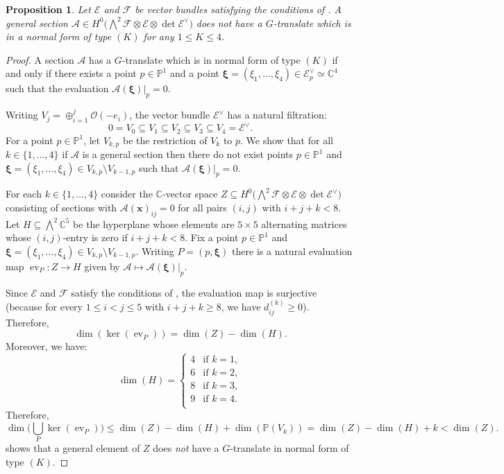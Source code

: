 \documentclass[11pt]{amsart}
\numberwithin{theorem}{section}
\numberwithin{equation}{section}
\newtheorem{proposition}[theorem]{Proposition}
\theoremstyle{definition}\newtheorem{defn}[theorem]{Definition}
\theoremstyle{definition}\newtheorem{remark}[theorem]{Remark}
\theoremstyle{definition}\newtheorem{question}[theorem]{Question}
\theoremstyle{definition}\newtheorem{problem}[theorem]{Problem}
\newcommand{\CC}{\mathbb{C}}
\newcommand{\PP}{\mathbb{P}}
\newcommand{\cE}{\mathcal{E}}
\newcommand{\cF}{\mathcal{F}}
\newcommand{\cA}{\mathcal{A}}
\newcommand{\cO}{\mathcal{O}}
\DeclareMathOperator{\ev}{ev}
\newcommand{\K}{K}
\begin{document}
\begin{proposition}
    \label{prop:case-K}
Let $\cE$ and $\cF$ be vector bundles satisfying the conditions of . A general section $\cA \in H^0 \Big(\bigwedge\nolimits^2 \cF \otimes \cE \otimes \det \cE^\vee \Big)$ does not have a $G$-translate which is in a normal form of type $(\K)$ for any $1 \leq \K \leq 4$.
\end{proposition}
\begin{proof}
A section $\cA$ has a $G$-translate which is in normal form of type $(\K)$ if and only if there exists a point $p \in \PP^1$ and a point $\boldsymbol{\xi} = (\xi_1, \dots ,\xi_4) \in \cE^{\vee}_p \simeq \CC^4$ such that the evaluation $\cA(\boldsymbol{\xi})\vert_p = 0$. 

Writing $V_j = \oplus_{i=1}^j \cO(-e_i)$, the vector bundle $\cE^{\vee}$ has a natural filtration:
\[
    0 = V_0 \subseteq V_1 \subseteq V_2 \subseteq V_3 \subseteq V_4 = \cE^{\vee}.
\]
For a point $p \in \PP^1$, let $V_{k,p}$ be the restriction of $V_k$ to $p$. We show that for all $k \in \{1,\dots, 4\}$ if $\cA$ is a general section then there do not exist points $p \in \PP^1$ and $\boldsymbol{\xi} = (\xi_1 , \dots ,\xi_4) \in V_{k,p} \setminus V_{k-1,p}$ such that $\cA(\boldsymbol{\xi})\vert_p = 0$.

For each $k \in \{1,\dots, 4\}$ consider the $\CC$-vector space $Z \subseteq H^0 \Big(\bigwedge\nolimits^2 \cF \otimes \cE \otimes \det \cE^\vee \Big)$ consisting of sections with $\cA(\mathbf{x})_{ij} = 0$ for all pairs $(i,j)$ with $i +j + k < 8$. Let $H \subseteq  \bigwedge^2 \CC^5$ be the hyperplane whose elements are $5 \times 5$ alternating matrices whose $(i,j)$-entry is zero if $i +j + k < 8$. Fix a point $p \in \PP^1$ and $\boldsymbol{\xi} = (\xi_1 , \dots, \xi_4) \in V_{k,p} \setminus V_{k-1,p}$. Writing $P = (p,\boldsymbol{\xi})$ there is a natural evaluation map $\ev_P : Z \to H$ given by $\cA \mapsto \cA(\boldsymbol{\xi})|_p $.

Since $\cE$ and $\cF$ satisfy the conditions of , the evaluation map is surjective (because for every $1 \leq i < j \leq 5$  with $i + j + k \geq 8$, we have $d_{ij}^{(k)} \geq 0$). Therefore, 
\[
    \dim(\ker (\ev_P)) = \dim(Z) - \dim(H).
\]
Moreover, we have:
\[
\dim(H) = 
\begin{cases}
  4 & \text{if } k = 1, \\
  6  & \text{if } k = 2, \\
  8  & \text{if } k = 3, \\
  9 & \text{if } k = 4. \\
\end{cases}
\]
Therefore, 
\begin{equation}
\label{eqn:dim-bound-K}
 \dim\Big (\bigcup_P \ker(\ev_P)\Big) \leq  \dim(Z) - \dim(H) + \dim(\PP(V_k)) = \dim(Z) - \dim(H) + k < \dim (Z). 
\end{equation}
 shows that a general element of $Z$ does \emph{not} have a $G$-translate in normal form of type $(\K)$.
\end{proof}
\end{document}
